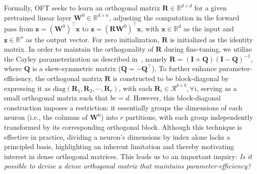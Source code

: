 Formally, OFT seeks to learn an orthogonal matrix $\bm{R}\in\mathbb{R}^{d\times d}$ for a given pretrained linear layer $\bm{W}^0\in\mathbb{R}^{d\times n}$, adjusting the computation in the forward pass from $\bm{z}=(\bm{W}^0)^\top\bm{x}$ to $\bm{z}=(\bm{R}\bm{W}^0)^\top\bm{x}$, with $\bm{x}\in\mathbb{R}^{d}$ as the input and $\bm{z}\in\mathbb{R}^{n}$ as the output vector. For zero initialization, $\bm{R}$ is initialized as the identity matrix. In order to maintain the orthogonality of $\bm{R}$ during fine-tuning, we utilize the Cayley parameterization as described in~\cite{qiu2023controlling,liu2021orthogonal}, namely $\bm{R}=(\bm{I}+\bm{Q})(\bm{I}-\bm{Q})^{-1}$, where $\bm{Q}$ is a skew-symmetric matrix ($\bm{Q}=-\bm{Q}^\top$). To further enhance parameter-efficiency, the orthogonal matrix $\bm{R}$ is constructed to be block-diagonal by expressing it as $\text{diag}(\bm{R}_1,\bm{R}_2,\cdots,\bm{R}_r)$, with each $\bm{R}_i\in\mathcal{R}^{b\times b}, \forall i$, serving as a small orthogonal matrix such that $br=d$. However, this block-diagonal construction imposes a restriction: it essentially groups the dimensions of each neuron (i.e., the columns of $\bm{W}^0$) into $r$ partitions, with each group independently transformed by its corresponding orthogonal block. Although this technique is effective in practice, dividing a neuron's dimensions by index alone lacks a principled basis, highlighting an inherent limitation and thereby motivating interest in dense orthogonal matrices. This leads us to an important inquiry: \emph{Is it possible to devise a dense orthogonal matrix that maintains parameter-efficiency?}

